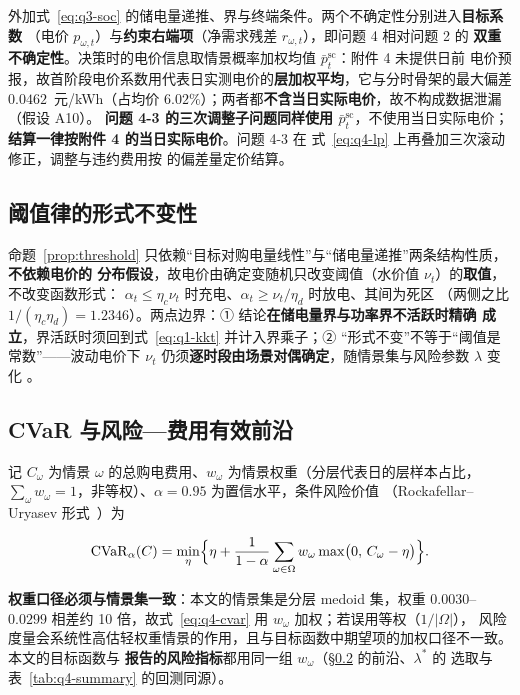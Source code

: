 外加式~\eqref{eq:q3-soc} 的储电量递推、界与终端条件。两个不确定性分别进入\textbf{目标系数}
（电价 \(p_{\omega,t}\)）与\textbf{约束右端项}（净需求残差 \(r_{\omega,t}\)），即问题 4 相对问题 2 的
\textbf{双重不确定性}。决策时的电价信息取情景概率加权均值 \(\bar p^{\text{sc}}_t\)：附件 4 未提供日前
电价预报，故首阶段电价系数用代表日实测电价的\textbf{层加权平均}，它与分时骨架的最大偏差
\(0.0462\)~元/kWh（占均价 \(6.02\%\)）；两者都\textbf{不含当日实际电价}，故不构成数据泄漏（假设 A10）。
\textbf{问题 4-3 的三次调整子问题同样使用 \(\bar p^{\text{sc}}_t\)}，不使用当日实际电价；
\textbf{结算一律按附件 4 的当日实际电价}。问题 4-3 在
式~\eqref{eq:q4-lp} 上再叠加三次滚动修正，调整与违约费用按  的偏差量定价结算。

\subsection{阈值律的形式不变性}

命题~\ref{prop:threshold} 只依赖“目标对购电量线性”与“储电量递推”两条结构性质，\textbf{不依赖电价的
分布假设}，故电价由确定变随机只改变阈值（水价值 \(\nu_t\)）的\textbf{取值}，不改变函数形式：
\(\alpha_t\le\eta_c\nu_t\) 时充电、\(\alpha_t\ge\nu_t/\eta_d\) 时放电、其间为死区
（两侧之比 \(1/(\eta_c\eta_d)=1.2346\)）。两点边界：① 结论\textbf{在储电量界与功率界不活跃时精确
成立}，界活跃时须回到式~\eqref{eq:q1-kkt} 并计入界乘子；② “形式不变”不等于“阈值是常数”——波动电价下
\(\nu_t\) 仍须\textbf{逐时段由场景对偶确定}，随情景集与风险参数 \(\lambda\) 变化 。

\subsection{CVaR 与风险—费用有效前沿}\label{sec:q4-frontier}

记 \(C_\omega\) 为情景 \(\omega\) 的总购电费用、\(w_\omega\) 为情景权重（分层代表日的层样本占比，
\(\sum_\omega w_\omega=1\)，非等权）、\(\alpha=0.95\) 为置信水平，条件风险价值
（Rockafellar--Uryasev 形式~\cite{refrockafellar}）为

\begin{equation}
  \mathrm{CVaR}_\alpha(C)=\min_{\eta}\Bigl\{\eta+\frac{1}{1-\alpha}
  \sum_{\omega\in\Omega}w_\omega\max\bigl(0,\,C_\omega-\eta\bigr)\Bigr\}.
  \label{eq:q4-cvar}
\end{equation}

\textbf{权重口径必须与情景集一致}：本文的情景集是分层 medoid 集，权重 \(0.0030\)--\(0.0299\)
相差约 10 倍，故式~\eqref{eq:q4-cvar} 用 \(w_\omega\) 加权；若误用等权（\(1/|\Omega|\)），
风险度量会系统性高估轻权重情景的作用，且与目标函数中期望项的加权口径不一致。本文的目标函数与
\textbf{报告的风险指标}都用同一组 \(w_\omega\)（\S\ref{sec:q4-frontier} 的前沿、\(\lambda^*\) 的
选取与表~\ref{tab:q4-summary} 的回测同源）。

